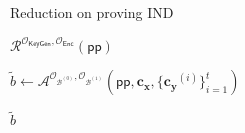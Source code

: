 \begin{frame}{Reduction on proving IND}
{\begin{minipage}{\textwidth}
\begin{block}{ $\mathcal{R}^{\mathcal{O}_{\textsf{KeyGen}}, \mathcal{O}_{\textsf{Enc}}}(\textsf{pp})$ }
\begin{algorithm}[H]
\begin{multicols}{2}
\begin{algorithmic}[1]
		\ENDFOR

		\STATE $\tilde{b} \gets {\mathcal{A}}^{\mathcal{O}_{\mathcal{B}^{(0)}}, \mathcal{O}_{\mathcal{B}^{(1)}} } (\textsf{pp}, \mathbf{c_x}, \{ \mathbf{c_y}^{(i)} \}_{i=1}^t )$ \label{alg:red:ind-ind:A}

		\RETURN $\tilde{b}$

	\end{algorithmic}
	\end{multicols}
	\end{algorithm}

	\end{block}
	\end{minipage}
}
\medskip


\end{frame}
